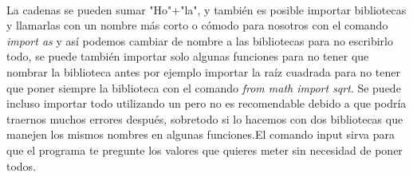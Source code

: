 \documentclass{book}
\begin{document}
	\\
	La cadenas se pueden  sumar "Ho"+"la", y también es posible importar bibliotecas y llamarlas con un nombre más corto o cómodo para nosotros con el comando \textit{import as} y así podemos cambiar de nombre a las bibliotecas para no escribirlo todo, se puede también importar solo algunas funciones para no tener que nombrar la biblioteca antes por ejemplo importar la raíz cuadrada para no tener que poner siempre la biblioteca con el comando \textit{from math import sqrt}. Se puede incluso importar todo utilizando un \* pero no es recomendable debido a que podría traernos muchos errores después, sobretodo si lo hacemos con dos bibliotecas que manejen los mismos nombres en algunas funciones.El comando input sirva para que el programa te pregunte los valores que quieres meter sin necesidad de poner todos.
	
	
	
\end{document}
